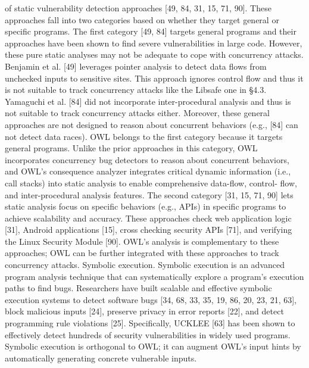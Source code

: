 of static vulnerability detection approaches [49, 84, 31,
15, 71, 90]. These approaches fall into two categories based
on whether they target general or specific programs.
The first category [49, 84] targets general programs and
their approaches have been shown to find severe vulnerabilities
in large code. However, these pure static analyses may
not be adequate to cope with concurrency attacks. Benjamin
et al. [49] leverages pointer analysis to detect data flows from
unchecked inputs to sensitive sites. This approach ignores
control flow and thus it is not suitable to track concurrency
attacks like the Libsafe one in §4.3. Yamaguchi et al. [84]
did not incorporate inter-procedural analysis and thus is not
suitable to track concurrency attacks either. Moreover, these
general approaches are not designed to reason about concurrent
behaviors (e.g., [84] can not detect data races).
OWL belongs to the first category because it targets general
programs. Unlike the prior approaches in this category,
OWL incorporates concurrency bug detectors to reason about
concurrent behaviors, and OWL’s consequence analyzer integrates
critical dynamic information (i.e., call stacks) into
static analysis to enable comprehensive data-flow, control-
flow, and inter-procedural analysis features.
The second category [31, 15, 71, 90] lets static analysis
focus on specific behaviors (e.g., APIs) in specific programs
to achieve scalability and accuracy. These approaches check
web application logic [31], Android applications [15], cross
checking security APIs [71], and verifying the Linux Security
Module [90]. OWL’s analysis is complementary to these
approaches; OWL can be further integrated with these approaches
to track concurrency attacks.
Symbolic execution. Symbolic execution is an advanced program
analysis technique that can systematically explore a program’s
execution paths to find bugs. Researchers have built
scalable and effective symbolic execution systems to detect
software bugs [34, 68, 33, 35, 19, 86, 20, 23, 21, 63], block
malicious inputs [24], preserve privacy in error reports [22],
and detect programming rule violations [25]. Specifically,
UCKLEE [63] has been shown to effectively detect hundreds
of security vulnerabilities in widely used programs. Symbolic
execution is orthogonal to OWL; it can augment OWL’s input
hints by automatically generating concrete vulnerable inputs.